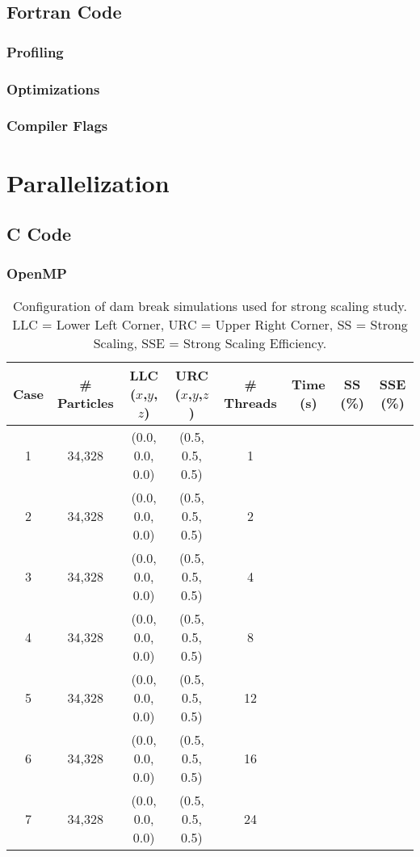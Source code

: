 \documentclass{scrartcl}
\begin{document}
  \subsection{Fortran Code}
  \subsubsection{Profiling}
  
  \subsubsection{Optimizations}
  \subsubsection{Compiler Flags}
  
  
  \section{Parallelization}
  \subsection{C Code}  
  \subsubsection{OpenMP}
  \begin{table}
  	\begin{tabular}{| c | c | c | c | c | c | c | c |}
  		\hline
  	Case & \# Particles & LLC ($x$,$y$,$z$) & URC ($x$,$y$,$z$) & \# Threads & Time (s) & SS (\%)& SSE (\%) \\ \hline
	1 & 34,328 & (0.0, 0.0, 0.0) & (0.5, 0.5, 0.5) & 1 & & & \\ \hline		  		
	2 & 34,328 & (0.0, 0.0, 0.0) & (0.5, 0.5, 0.5) & 2 & & & \\ \hline		  		
	3 & 34,328 & (0.0, 0.0, 0.0) & (0.5, 0.5, 0.5) & 4 & & & \\ \hline		  		
	4 & 34,328 & (0.0, 0.0, 0.0) & (0.5, 0.5, 0.5) & 8 & & & \\ \hline		  		
	5 & 34,328 & (0.0, 0.0, 0.0) & (0.5, 0.5, 0.5) & 12 & & & \\ \hline		  		
	6 & 34,328 & (0.0, 0.0, 0.0) & (0.5, 0.5, 0.5) & 16 & & & \\ \hline		  		
	7 & 34,328 & (0.0, 0.0, 0.0) & (0.5, 0.5, 0.5) & 24 & & & \\ \hline		  		
	\end{tabular}
	\caption{Configuration of dam break simulations used for strong scaling study. LLC = Lower Left Corner, URC = Upper Right Corner, SS = Strong Scaling, SSE = Strong Scaling Efficiency.}
	\label{tab:ss}
  \end{table}
  
\end{document}
